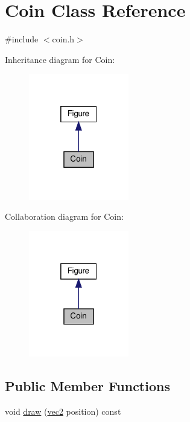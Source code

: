 \hypertarget{classCoin}{}\section{Coin Class Reference}
\label{classCoin}


{\ttfamily \#include $<$coin.\+h$>$}



Inheritance diagram for Coin\+:
\nopagebreak
\begin{figure}[H]
\begin{center}
\leavevmode
\includegraphics[width=124pt]{dc/d38/classCoin__inherit__graph}
\end{center}
\end{figure}


Collaboration diagram for Coin\+:
\nopagebreak
\begin{figure}[H]
\begin{center}
\leavevmode
\includegraphics[width=124pt]{d7/de3/classCoin__coll__graph}
\end{center}
\end{figure}
\subsection*{Public Member Functions}
\begin{DoxyCompactItemize}
\item 
void \hyperlink{classCoin_a13812f35d85e19553fe36350c947204c}{draw} (\hyperlink{structvec2}{vec2} position) const
\end{DoxyCompactItemize}


